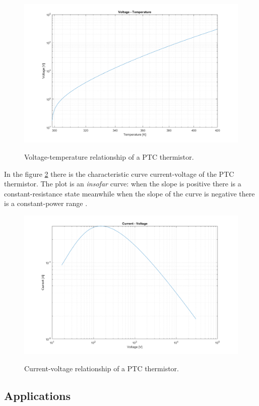 \begin{figure}[h]
    \centering
    \includegraphics[width = .7\textwidth]{../res/plots/PTC_volt-temp.png}
    \label{fig:PTC_volt-temp}
    \caption{Voltage-temperature relationship of a PTC thermistor.}
\end{figure}

\FloatBarrier \noindent In the figure \ref{fig:PTC_curr-volt} there is the characteristic curve current-voltage of the PTC thermistor. The plot is an \textsl{insofar} curve: when the slope is positive there is a constant-resistance state meanwhile when the slope of the curve is negative there is a constant-power range \cite{Saburi196353}.

\begin{figure}[h]
    \centering
    \includegraphics[width = .7\textwidth]{../res/plots/PTC_curr-volt.png}
    \label{fig:PTC_curr-volt}
    \caption{Current-voltage relationship of a PTC thermistor.}
\end{figure}

\FloatBarrier \subsection{Applications}





